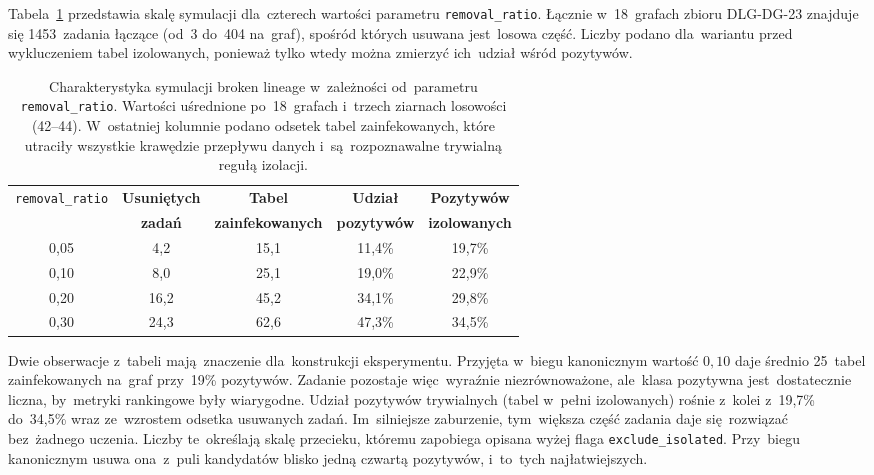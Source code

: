 Tabela~\ref{tab:symulacja} przedstawia skalę symulacji dla~czterech wartości
parametru \texttt{removal\_ratio}. Łącznie w~18~grafach zbioru DLG-DG-23
znajduje się 1453~zadania łączące (od~3 do~404 na~graf), spośród których usuwana
jest~losowa część. Liczby podano dla~wariantu przed wykluczeniem tabel
izolowanych, ponieważ tylko wtedy można zmierzyć ich~udział wśród pozytywów.

\begin{table}[ht]
\centering
\caption[Charakterystyka symulacji broken lineage]{Charakterystyka symulacji broken lineage w~zależności
od~parametru \texttt{removal\_ratio}. Wartości uśrednione po~18~grafach
i~trzech ziarnach losowości (42--44). W~ostatniej kolumnie podano odsetek
tabel zainfekowanych, które utraciły wszystkie krawędzie przepływu
danych i~są~rozpoznawalne trywialną regułą izolacji.}
\label{tab:symulacja}
\begin{tabular}{ccccc}
\toprule
\texttt{removal\_ratio} & \textbf{Usuniętych} & \textbf{Tabel} & \textbf{Udział} & \textbf{Pozytywów} \\
 & \textbf{zadań} & \textbf{zainfekowanych} & \textbf{pozytywów} & \textbf{izolowanych} \\
\midrule
0{,}05 & 4{,}2 & 15{,}1 & 11{,}4\% & 19{,}7\% \\
0{,}10 & 8{,}0 & 25{,}1 & 19{,}0\% & 22{,}9\% \\
0{,}20 & 16{,}2 & 45{,}2 & 34{,}1\% & 29{,}8\% \\
0{,}30 & 24{,}3 & 62{,}6 & 47{,}3\% & 34{,}5\% \\
\bottomrule
\end{tabular}
\end{table}

Dwie obserwacje z~tabeli mają~znaczenie dla~konstrukcji eksperymentu.
Przyjęta w~biegu kanonicznym wartość $0{,}10$ daje średnio 25~tabel
zainfekowanych na~graf przy~19\% pozytywów. Zadanie pozostaje więc~wyraźnie
niezrównoważone, ale~klasa pozytywna jest~dostatecznie liczna, by~metryki
rankingowe były wiarygodne. Udział pozytywów trywialnych (tabel w~pełni
izolowanych) rośnie z~kolei z~19{,}7\% do~34{,}5\% wraz ze~wzrostem
odsetka usuwanych zadań. Im~silniejsze zaburzenie, tym~większa część zadania
daje się~rozwiązać bez~żadnego uczenia. Liczby te~określają skalę przecieku,
któremu zapobiega opisana wyżej flaga \texttt{exclude\_isolated}. Przy~biegu
kanonicznym usuwa ona~z~puli kandydatów blisko jedną czwartą pozytywów,
i~to~tych najłatwiejszych.


